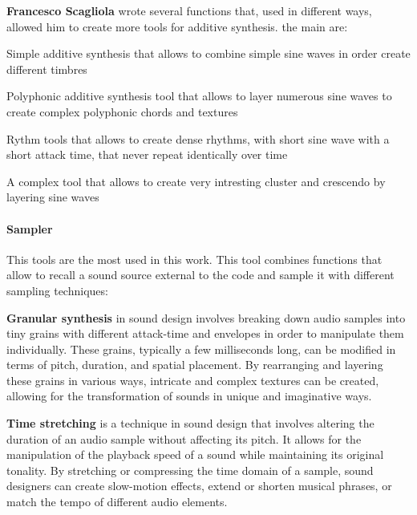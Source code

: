 		\textbf{Francesco Scagliola} wrote several functions that, used in different ways, allowed him to create more tools for additive synthesis. the main are:
		
		\begin{compactitem}
			\item Simple additive synthesis that allows to combine simple sine waves in order create different timbres
			\item Polyphonic additive synthesis tool that allows to layer numerous sine waves to create complex polyphonic chords and textures
			\item Rythm tools that allows to create dense rhythms, with short sine wave with a short attack time, that never repeat identically over time
			\item A complex tool that allows to create very intresting cluster and crescendo by layering sine waves
		\end{compactitem}
		
		\paragraph{Sampler} This tools are the most used in this work.
		This tool combines functions that allow to recall a sound source external to the code and sample it with different sampling techniques:
		
			\begin{compactitem}
				\item \textbf{Granular synthesis} in sound design involves breaking down audio samples into tiny grains with different attack-time and envelopes in order to manipulate them individually. These grains, typically a few milliseconds long, can be modified in terms of pitch, duration, and spatial placement. By rearranging and layering these grains in various ways, intricate and complex textures can be created, allowing for the transformation of sounds in unique and imaginative ways.
				\item \textbf{Time stretching} is a technique in sound design that involves altering the duration of an audio sample without affecting its pitch. It allows for the manipulation of the playback speed of a sound while maintaining its original tonality. By stretching or compressing the time domain of a sample, sound designers can create slow-motion effects, extend or shorten musical phrases, or match the tempo of different audio elements.
			\end{compactitem}
		
